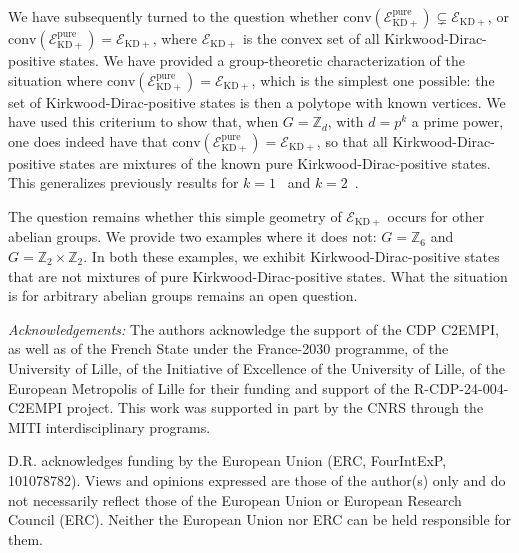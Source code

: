 \documentclass[a4paper, notitlepage, 11pt]{article}
\numberwithin{equation}{section}
\newcommand{\mcl}[1]{\ensuremath{\mathcal{#1}}}
\newcommand{\EcalKDC}{{\mcl E}_{\mathrm{KD+}}}
\newcommand{\EcalKDCpu}{{\mcl E}_{\mathrm{KD+}}^{\mathrm{pure}}}
\newcommand{\Z}{\mathbb{Z}}
\newcommand{\conv}[1]{\mathrm{conv}\left(#1\right)}
\begin{document}
We have subsequently turned to the question whether $\conv{\EcalKDCpu} \subsetneq \EcalKDC$, or $\conv{\EcalKDCpu} = \EcalKDC$, where $\EcalKDC$ is the convex set of all Kirkwood-Dirac-positive states. We have provided a group-theoretic characterization of the situation where $\conv{\EcalKDCpu} = \EcalKDC$, which is the simplest one possible: the set of Kirkwood-Dirac-positive states is then a polytope with known vertices. We have used this criterium to show that, when $G=\Z_d$, with $d=p^k$ a prime power, one does indeed have that $\conv{\EcalKDCpu} = \EcalKDC$, so that all Kirkwood-Dirac-positive states are mixtures of the known pure Kirkwood-Dirac-positive states. This generalizes previously results for $k=1$~\cite{langrenez2023characterizing2} and $k=2$~\cite{Yang_2024}.

The question remains whether this simple geometry of $\EcalKDC$ occurs for other abelian groups. We provide two examples where it does not: $G=\Z_6$ and $G=\Z_2\times \Z_2$. In both these examples, we
exhibit Kirkwood-Dirac-positive states that are not mixtures of pure Kirkwood-Dirac-positive states.  What the situation is for arbitrary abelian groups remains an open question. 

\medskip
\noindent \textit{Acknowledgements: } The authors acknowledge the support of the CDP C2EMPI, as well as of the French State under the France-2030 programme, of the University of Lille, of the Initiative of Excellence of the University of Lille, of the European Metropolis of Lille for their funding and support of the R-CDP-24-004-C2EMPI project. This work was supported in part by the CNRS through the MITI interdisciplinary programs. 

D.R. acknowledges funding by the European Union (ERC, FourIntExP, 101078782). Views and opinions expressed are those of the author(s) only and do not necessarily reflect those of the European Union or European Research Council (ERC). Neither the European Union nor ERC can be held responsible for them.


\end{document}
